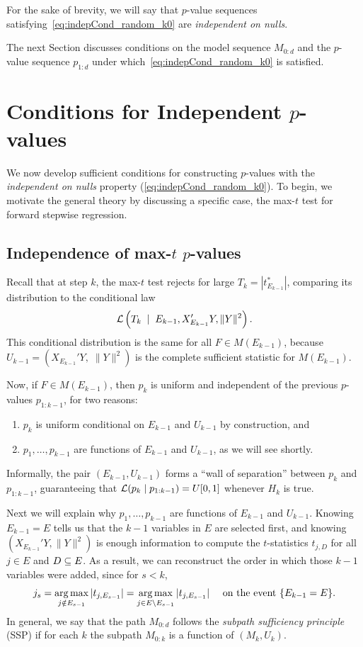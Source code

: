 \documentclass{article}
\begin{document}
For the sake of brevity, we will say that $p$-value sequences satisfying~\eqref{eq:indepCond_random_k0} are {\em independent on nulls}.

The next Section discusses conditions on the model sequence $M_{0:d}$ and the $p$-value sequence $p_{1:d}$ under which~\eqref{eq:indepCond_random_k0} is satisfied.

\section{Conditions for Independent $p$-values}\label{sec:pValsIndep}

We now develop sufficient conditions for constructing $p$-values with the {\it independent on nulls} property (\ref{eq:indepCond_random_k0}). To begin, we motivate the general theory by discussing a specific case, the max-$t$ test for forward stepwise regression.

\subsection{Independence of max-$t$ $p$-values}

Recall that at step $k$, the max-$t$ test rejects for large $T_k=|t_{E_{k-1}}^*|$, comparing its distribution to the conditional law
\begin{equation}\label{eq:maxTnull}
\mathcal{L}\left(T_k \; \mid \; E_{k-1}, X_{E_{k-1}}'Y, \|Y\|^2 \right).
\end{equation}
This conditional distribution is the same for all $F\in M(E_{k-1})$, because $U_{k-1}=(X_{E_{k-1}}'Y,\; \|Y\|^2)$ is the complete sufficient statistic for $M(E_{k-1})$.

Now, if $F\in M(E_{k-1})$, then $p_k$ is uniform and independent of the previous $p$-values $p_{1:k-1}$, for two reasons:
\begin{enumerate}
\item $p_k$ is uniform conditional on $E_{k-1}$ and $U_{k-1}$ by construction, and
\item $p_1, \ldots, p_{k-1}$ are functions of $E_{k-1}$ and $U_{k-1}$, as we will see shortly.
\end{enumerate}

Informally, the pair $(E_{k-1}, U_{k-1})$ forms a ``wall of separation'' between $p_k$ and $p_{1:k-1}$, guaranteeing that $\mathcal{L}(p_k \mid p_{1:k-1}) = U[0,1]$ whenever $H_k$ is true. 

Next we will explain why $p_1,\ldots,p_{k-1}$ are functions of $E_{k-1}$ and $U_{k-1}$. Knowing $E_{k-1}=E$ tells us that the $k-1$ variables in $E$ are selected first, and knowing $(X_{E_{k-1}}'Y,\|Y\|^2)$ is enough information to compute the $t$-statistics $t_{j,D}$ for all $j\in E$ and $D\subseteq E$. As a result, we can reconstruct the order in which those $k-1$ variables were added, since for $s<k$, 
\[
j_s = \operatorname*{arg\,max}_{j \notin E_{s-1}} |t_{j,E_{s-1}}| 
= \operatorname*{arg\,max}_{j \in E\setminus E_{s-1}} |t_{j,E_{s-1}}| \quad \text{ on the event } \{E_{k-1}=E\}.
\]
In general, we say that the path $M_{0:d}$ follows the {\em subpath sufficiency principle} (SSP) if for each $k$ the subpath $M_{0:k}$ is a function of $(M_k,U_k)$.
\end{document}
